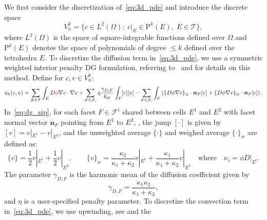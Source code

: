 We first consider the discretization of~\eqref{eq:3d_pde} and
introduce the discrete space
\begin{equation}
  V_h^k = \{c \in L^2(\Omega): \;  c \vert_E \in \mathrm{P}^k(E), \; E \in \mathcal{T}\} ,
\end{equation}
where $L^2(\Omega)$ is the space of square-integrable functions
defined over $\Omega$ and $\mathrm{P}^k(E)$ denotes the space of
polynomials of degree $\leqslant k$ defined over the tetrahedra
$E$. To discretize the diffusion term in~\eqref{eq:3d_pde}, we use a
symmetric weighted interior penalty DG formulation, referring
to~\cite{ern2009discontinuous} and \cite[Section
  4.5.2.3]{di2011mathematical} for details on this
method. 
Define for $c, v \in V_h^k$:
\begin{equation}
  a_h (c, v)
  =
  \sum_{E \in \mathcal{T}} \int_{E} D \textcolor{red}{\phi} \nabla c \cdot \nabla v
  + \sum_{F \in \mathcal{F}_i} \eta \frac{\gamma_{D,F}}{h_F} \int_{F} [c][v] 
  - \sum_{F \in \mathcal{F}_i} \int_{F} \left( \{D \phi \nabla c \}_w \cdot \bm n_F [v]
  + \{D \phi \nabla v \}_w \cdot \bm n_F [c] \right).
  \label{eq:dg_sip}
\end{equation}
In~\eqref{eq:dg_sip}, for each facet $F \in \mathcal{F}^i$ shared
between cells $E^1$ and $E^2$ with facet normal vector $\bm n_F$
pointing from $E^1$ to $E^2$, ,
the jump $[\cdot]$ is given by $[v] = v|_{E^1} - v|_{E^2}$, and the
unweighted average $\{ \cdot \}$ and weighed average $\{ \cdot \}_w$
are defined as:
\begin{equation}
  \{v\} = \frac12 v |_{E^1} + \frac12 v |_{E^2}, \qquad
  \{v\}_{w} = \frac{\kappa_2}{\kappa_1 + \kappa_2} v |_{E^1} + \frac{\kappa_1}{\kappa_1 + \kappa_2} v |_{E^2}
  \quad \text{where} \quad \kappa_i = \phi D|_{E^i}.  
\end{equation}
The parameter $\gamma_{D,F}$ is the harmonic mean of the
 diffusion coefficient given by
\begin{equation}
  \gamma_{D,F} = \frac{\kappa_1\kappa_2}{\kappa_1 + \kappa_2},
\end{equation}
and $\eta$ is a user-specified penalty parameter. To discretize the convection term in~\eqref{eq:3d_pde}, we use
upwinding, see \cite[Section 2.3.1]{di2011mathematical} and the
